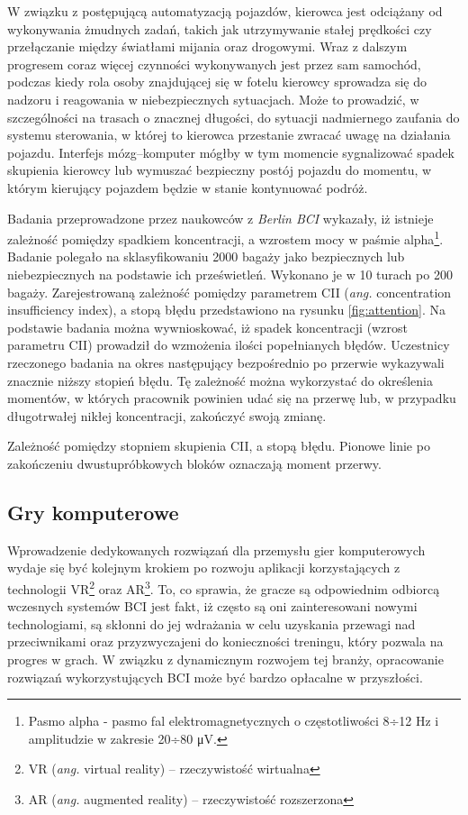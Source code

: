 \documentclass[skorowidz,skroty]{dyplomWEZUT}
\begin{document}
W związku z postępującą automatyzacją pojazdów, kierowca jest odciążany od wykonywania żmudnych zadań, takich jak utrzymywanie stałej prędkości czy przełączanie między światłami mijania oraz drogowymi. Wraz z dalszym progresem coraz więcej czynności wykonywanych jest przez sam samochód, podczas kiedy rola osoby znajdującej się w fotelu kierowcy sprowadza się do nadzoru i reagowania w niebezpiecznych sytuacjach. Może to prowadzić, w szczególności na trasach o znacznej długości, do sytuacji nadmiernego zaufania do systemu sterowania, w której to kierowca przestanie zwracać uwagę na działania pojazdu. Interfejs mózg--komputer mógłby w tym momencie sygnalizować spadek skupienia kierowcy lub wymuszać bezpieczny postój pojazdu do momentu, w którym kierujący pojazdem będzie w stanie kontynuować podróż.

Badania przeprowadzone przez naukowców z \textit{Berlin BCI} wykazały, iż istnieje zależność pomiędzy spadkiem koncentracji, a wzrostem mocy w paśmie alpha\footnote{Pasmo alpha - pasmo fal elektromagnetycznych o częstotliwości 8÷12 Hz i amplitudzie w zakresie 20÷80 μV\cite[str. 17]{bci_handbook}.}\cite{bci_applications}. Badanie polegało na sklasyfikowaniu 2000 bagaży jako bezpiecznych lub niebezpiecznych na podstawie ich prześwietleń. Wykonano je w 10 turach po 200 bagaży. Zarejestrowaną zależność pomiędzy parametrem CII (\textit{ang.} concentration insufficiency index), a stopą błędu przedstawiono na rysunku \vref{fig:attention}. Na podstawie badania można wywnioskować, iż spadek koncentracji (wzrost parametru CII) prowadził do wzmożenia ilości popełnianych błędów. Uczestnicy rzeczonego badania na okres następujący bezpośrednio po przerwie wykazywali znacznie niższy stopień błędu. Tę zależność można wykorzystać do określenia momentów, w których pracownik powinien udać się na przerwę lub, w przypadku długotrwałej nikłej koncentracji, zakończyć swoją zmianę.

{Zależność pomiędzy stopniem skupienia CII, a stopą błędu. Pionowe linie po zakończeniu dwustupróbkowych bloków oznaczają moment przerwy.\label{fig:attention}}
{\cite{bci_applications}}


\subsection{Gry komputerowe}
Wprowadzenie dedykowanych rozwiązań dla przemysłu gier komputerowych wydaje się być kolejnym krokiem po rozwoju aplikacji korzystających z technologii VR\footnote{VR (\textit{ang.} virtual reality) -- rzeczywistość wirtualna} oraz AR\footnote{AR (\textit{ang.} augmented reality) -- rzeczywistość rozszerzona}. To, co sprawia, że gracze są odpowiednim odbiorcą wczesnych systemów BCI jest fakt, iż często są oni zainteresowani nowymi technologiami, są skłonni do jej wdrażania w celu uzyskania przewagi nad przeciwnikami oraz przyzwyczajeni do konieczności treningu, który pozwala na progres w grach\cite{bci_games_survey}. W związku z dynamicznym rozwojem tej branży, opracowanie rozwiązań wykorzystujących BCI może być bardzo opłacalne w przyszłości.
\end{document}
